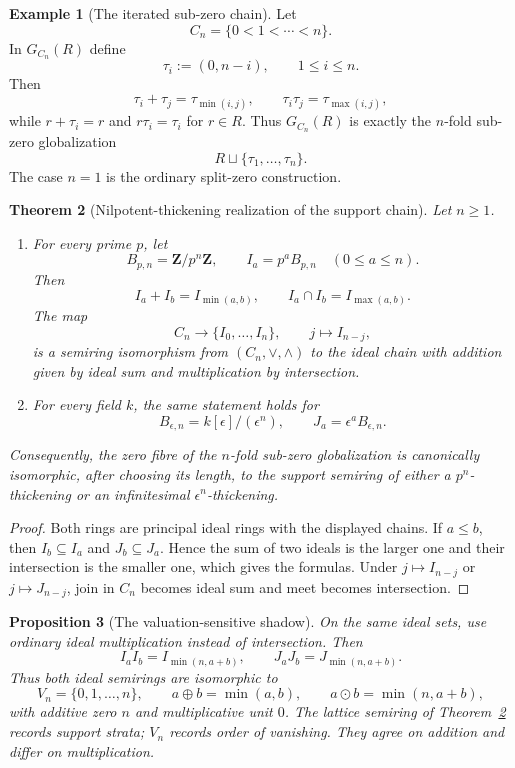 \documentclass[11pt]{amsart}
\numberwithin{equation}{section}
\newtheorem{theorem}{Theorem}[section]
\newtheorem{proposition}[theorem]{Proposition}
\theoremstyle{definition}
\newtheorem{example}[theorem]{Example}
\newcommand{\Z}{\mathbf Z}
\begin{document}
\begin{example}[The iterated sub-zero chain]
Let
\[
C_n=\{0<1<\cdots<n\}.
\]
In $G_{C_n}(R)$ define
\[
\tau_i:=(0,n-i),
\qquad 1\leq i\leq n.
\]
Then
\[
\tau_i+\tau_j=\tau_{\min(i,j)},
\qquad
\tau_i\tau_j=\tau_{\max(i,j)},
\]
while $r+\tau_i=r$ and $r\tau_i=\tau_i$ for $r\in R$.  Thus
$G_{C_n}(R)$ is exactly the $n$-fold sub-zero globalization
\[
R\sqcup\{\tau_1,\dots,\tau_n\}.
\]
The case $n=1$ is the ordinary split-zero construction.
\end{example}

\begin{theorem}[Nilpotent-thickening realization of the support chain]
\label{thm:nilpotent-chain-realization}
Let $n\geq1$.
\begin{enumerate}[label=\textup{(\arabic*)}]
\item For every prime $p$, let
\[
B_{p,n}=\Z/p^n\Z,
\qquad
I_a=p^aB_{p,n}
\quad(0\leq a\leq n).
\]
Then
\[
I_a+I_b=I_{\min(a,b)},
\qquad
I_a\cap I_b=I_{\max(a,b)}.
\]
The map
\[
C_n\longrightarrow\{I_0,\dots,I_n\},
\qquad
j\longmapsto I_{n-j},
\]
is a semiring isomorphism from $(C_n,\vee,\wedge)$ to the ideal chain
with addition given by ideal sum and multiplication by intersection.
\item For every field $k$, the same statement holds for
\[
B_{\epsilon,n}=k[\epsilon]/(\epsilon^n),
\qquad
J_a=\epsilon^aB_{\epsilon,n}.
\]
\end{enumerate}
Consequently, the zero fibre of the $n$-fold sub-zero globalization is
canonically isomorphic, after choosing its length, to the support semiring
of either a $p^n$-thickening or an infinitesimal $\epsilon^n$-thickening.
\end{theorem}

\begin{proof}
Both rings are principal ideal rings with the displayed chains.  If
$a\leq b$, then $I_b\subseteq I_a$ and $J_b\subseteq J_a$.  Hence the
sum of two ideals is the larger one and their intersection is the smaller
one, which gives the formulas.  Under $j\mapsto I_{n-j}$ or
$j\mapsto J_{n-j}$, join in $C_n$ becomes ideal sum and meet becomes
intersection.
\end{proof}

\begin{proposition}[The valuation-sensitive shadow]
\label{prop:truncated-valuation-semiring}
On the same ideal sets, use ordinary ideal multiplication instead of
intersection.  Then
\[
I_aI_b=I_{\min(n,a+b)},
\qquad
J_aJ_b=J_{\min(n,a+b)}.
\]
Thus both ideal semirings are isomorphic to
\[
V_n=\{0,1,\dots,n\},
\qquad
a\oplus b=\min(a,b),
\qquad
a\odot b=\min(n,a+b),
\]
with additive zero $n$ and multiplicative unit $0$.  The lattice semiring
of Theorem~\ref{thm:nilpotent-chain-realization} records support strata;
$V_n$ records order of vanishing.  They agree on addition and differ on
multiplication.
\end{proposition}
\end{document}
